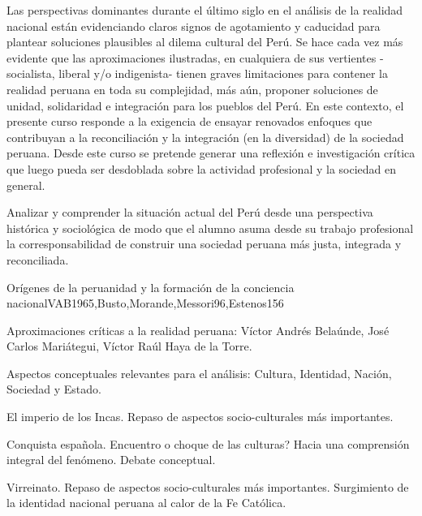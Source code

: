 \begin{syllabus}


\begin{justification}
Las perspectivas dominantes durante el último siglo en el análisis de la realidad nacional están evidenciando claros signos de agotamiento y caducidad para plantear soluciones plausibles al dilema cultural del Perú. Se hace cada vez más evidente que las aproximaciones ilustradas, en cualquiera de sus  vertientes -socialista, liberal y/o indigenista- tienen graves limitaciones para contener la realidad peruana en toda su complejidad, más aún, proponer soluciones de unidad, solidaridad e integración para los pueblos del Perú. 
En este contexto, el presente curso responde a la exigencia de ensayar renovados enfoques que contribuyan a la reconciliación y la integración (en la diversidad) de la sociedad peruana. Desde este curso se pretende generar una reflexión e investigación crítica que luego pueda ser desdoblada sobre la actividad profesional y la sociedad en general.
\end{justification}

\begin{goals}
\item Analizar y comprender la situación actual del Perú desde una perspectiva histórica y sociológica de modo que el alumno asuma desde su trabajo profesional la corresponsabilidad de construir una sociedad peruana más justa, integrada y reconciliada.
\end{goals}

\begin{outcomes}
\end{outcomes}

\begin{unit}{Orígenes de la peruanidad y la formación de la conciencia nacional}{VAB1965,Busto,Morande,Messori96,Estenos}{15}{6}
\begin{topics}
	\item Aproximaciones críticas a la realidad peruana: Víctor Andrés Belaúnde, José Carlos Mariátegui, Víctor Raúl Haya de la Torre.
	\item Aspectos conceptuales relevantes para el análisis: Cultura, Identidad, Nación, Sociedad y Estado. 
	\item El imperio de los Incas. Repaso de  aspectos socio-culturales más importantes. 
	\item Conquista española. Encuentro o choque de las culturas? Hacia una comprensión integral del fenómeno. Debate conceptual. 
	\item Virreinato. Repaso de  aspectos socio-culturales más importantes. Surgimiento de la identidad nacional peruana al calor de la Fe Católica.  


\end{topics}
\end{unit}
\end{syllabus}
